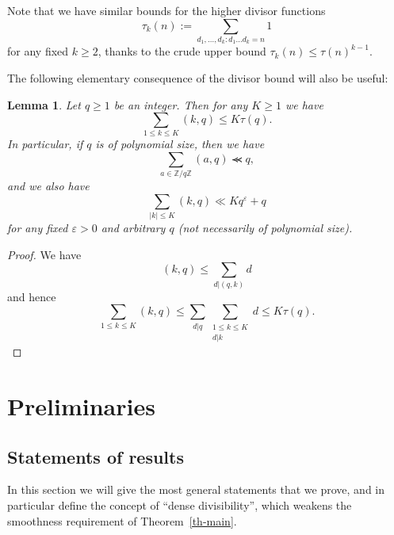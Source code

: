 \documentclass[12pt,a4paper,reqno]{amsart}
\numberwithin{equation}{section}
\theoremstyle{plain}
\newtheorem{lemma}[theorem]{Lemma}
\theoremstyle{definition}
\newcommand\Z{\mathbb{Z}}
\newcommand\eps{\varepsilon}
\renewcommand{\lessapprox}{\llcurly}
\begin{document}
Note that we have similar bounds for the higher divisor functions
$$ \tau_k(n) := \sum_{d_1,\ldots,d_k: d_1 \ldots d_k = n} 1$$
for any fixed $k \geq 2$, thanks to the crude upper bound $\tau_k(n) \leq \tau(n)^{k-1}$.

The following elementary consequence of the divisor bound will also be useful:

\begin{lemma}\label{ram-avg} Let $q\geq 1$ be an integer.  Then for
  any $K \geq 1$ we have
$$ 
\sum_{1 \leq k \leq K} (k,q) \leq K\tau(q).
$$
In particular, if $q$ is of polynomial size, then we have
$$ 
\sum_{a \in \Z/q\Z} (a,q) \lessapprox q,
$$
and we also have
$$ 
\sum_{|k| \leq K} (k,q) \ll Kq^{\eps} + q
$$
for any fixed $\eps>0$ and arbitrary $q$ (not necessarily of polynomial size).
\end{lemma}


\begin{proof}  We have
$$
(k,q)\leq \sum_{d|(q,k)} d
$$
and hence
$$
\sum_{1 \leq k \leq K}(k,q) \leq \sum_{d|q} \sum_{\substack{1 \leq k
    \leq K\\d|k}} d \leq K \tau(q).
$$
\end{proof}





\section{Preliminaries}\label{sec-technical}

\subsection{Statements of results}

In this section we will give the most general statements that we
prove, and in particular define the concept of ``dense divisibility'',
which weakens the smoothness requirement of Theorem~\ref{th-main}.
\end{document}
